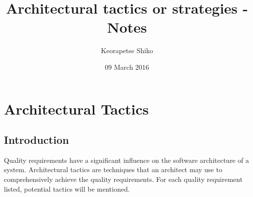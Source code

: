 \documentclass[a4paper,12pt]{article}
\begin{document}
\title{Architectural tactics or strategies - Notes}
\author{Keorapetse Shiko}
\date{09 March 2016}
\maketitle

\cleardoublepage

\section{Architectural Tactics}

	\subsection{Introduction}
	Quality requirements have a significant influence on the software architecture of a system. Architectural tactics are techniques that an 
	architect may use to comprehensively achieve the quality requirements. For each quality requirement listed, potential tactics will be mentioned.
\end{document}
